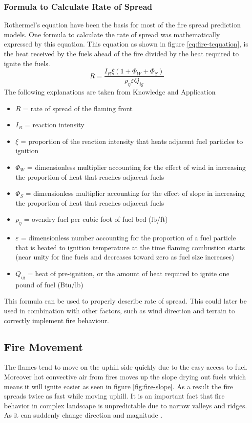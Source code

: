 \subsubsection{Formula to Calculate Rate of Spread}
Rothermel’s equation have been the basis for most of the fire spread prediction models. One formula to calculate the rate of spread was mathematically expressed by this equation. This equation as shown in figure \ref{eq:fire-tequation}, is the heat received by the fuels ahead of the fire divided by the heat required to ignite the fuels\cite{wildfire}.
\begin{equation}
R=\dfrac{I_R \xi(1 + \Phi_W + \Phi_S)}{\rho _{\eta} \varepsilon  Q_{ig}}
\label{eq:fire-tequation}
\end{equation}
The following explanations are taken from Knowledge and Application \cite{rateofspread}
\begin{itemize}
\item $ R $ = rate of spread of the flaming front
\item $I_R$ = reaction intensity
\item $\xi$ = proportion of the reaction intensity that heats adjacent fuel particles to ignition
\item $\Phi_W$ = dimensionless multiplier accounting for the effect of wind in increasing the proportion of heat that reaches adjacent fuels
\item $\Phi_S$ = dimensionless multiplier accounting for the effect of slope in increasing the proportion of heat that reaches adjacent fuels
\item $\rho _{\eta}$ = ovendry fuel per cubic foot of fuel bed (lb/ft)
\item $\varepsilon$ = dimensionless number accounting for the proportion of a fuel particle that is heated to ignition temperature at the time flaming combustion starts (near unity for fine fuels and decreases toward zero as fuel size increases)
\item $Q_{ig}$ = heat of pre-ignition, or the amount of heat required to ignite one pound of fuel (Btu/lb)
\end{itemize}
This formula can be used to properly describe rate of spread. This could later be used in combination with other factors, such as wind direction and terrain to correctly implement fire behaviour.


\subsection{Fire Movement}
The flames tend to move on the uphill side quickly due to the easy access to fuel. Moreover hot convective air from fires moves up the slope drying out fuels which means it will ignite easier as seen in figure \ref{fig:fire-slope}. As a result the fire spreads twice as fast while moving uphill. It is an important fact that fire behavior in complex landscape is unpredictable due to narrow valleys and ridges. As it can suddenly change direction and magnitude \cite{firemov}.


